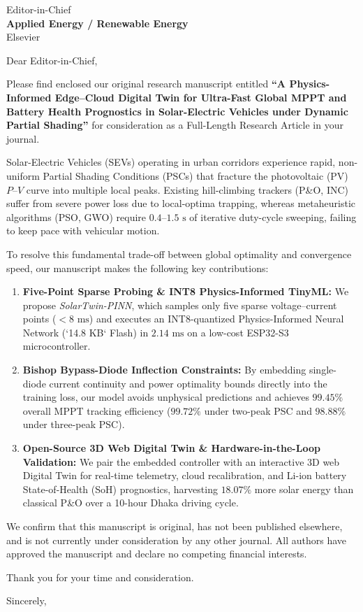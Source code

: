 \documentclass[11pt,a4paper]{letter}
\begin{document}
\begin{letter}{Editor-in-Chief\\\textbf{Applied Energy / Renewable Energy}\\Elsevier}

\opening{Dear Editor-in-Chief,}

Please find enclosed our original research manuscript entitled \textbf{``A Physics-Informed Edge--Cloud Digital Twin for Ultra-Fast Global MPPT and Battery Health Prognostics in Solar-Electric Vehicles under Dynamic Partial Shading''} for consideration as a Full-Length Research Article in your journal.

Solar-Electric Vehicles (SEVs) operating in urban corridors experience rapid, non-uniform Partial Shading Conditions (PSCs) that fracture the photovoltaic (PV) $P\text{--}V$ curve into multiple local peaks. Existing hill-climbing trackers (P\&O, INC) suffer from severe power loss due to local-optima trapping, whereas metaheuristic algorithms (PSO, GWO) require $0.4\text{--}1.5\text{ s}$ of iterative duty-cycle sweeping, failing to keep pace with vehicular motion.

To resolve this fundamental trade-off between global optimality and convergence speed, our manuscript makes the following key contributions:
\begin{enumerate}
    \item \textbf{Five-Point Sparse Probing \& INT8 Physics-Informed TinyML:} We propose \emph{SolarTwin-PINN}, which samples only five sparse voltage--current points ($<8\text{ ms}$) and executes an INT8-quantized Physics-Informed Neural Network (`14.8 KB` Flash) in $2.14\text{ ms}$ on a low-cost ESP32-S3 microcontroller.
    \item \textbf{Bishop Bypass-Diode Inflection Constraints:} By embedding single-diode current continuity and power optimality bounds directly into the training loss, our model avoids unphysical predictions and achieves $99.45\%$ overall MPPT tracking efficiency ($99.72\%$ under two-peak PSC and $98.88\%$ under three-peak PSC).
    \item \textbf{Open-Source 3D Web Digital Twin \& Hardware-in-the-Loop Validation:} We pair the embedded controller with an interactive 3D web Digital Twin for real-time telemetry, cloud recalibration, and Li-ion battery State-of-Health (SoH) prognostics, harvesting $18.07\%$ more solar energy than classical P\&O over a 10-hour Dhaka driving cycle.
\end{enumerate}

We confirm that this manuscript is original, has not been published elsewhere, and is not currently under consideration by any other journal. All authors have approved the manuscript and declare no competing financial interests.

Thank you for your time and consideration.

\closing{Sincerely,}

\end{letter}
\end{document}
